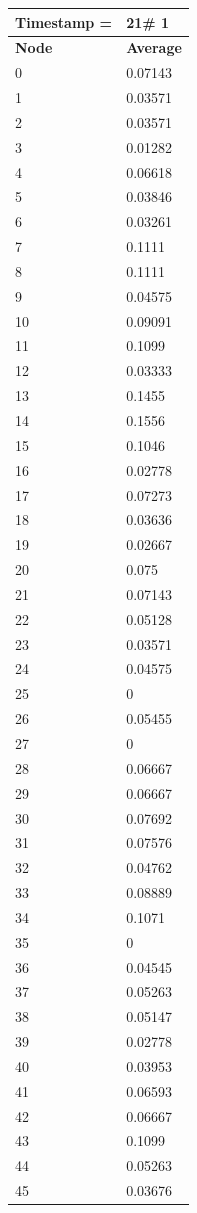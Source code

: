 \begin{tabular}{|l||l|}
\hline
\textbf{Timestamp =} & \textbf{21}\# 1\\\hline
	\textbf{Node} & \textbf{Average} \\ \hline
\hline
	0 & 0.07143 \\ \hline
	1 & 0.03571 \\ \hline
	2 & 0.03571 \\ \hline
	3 & 0.01282 \\ \hline
	4 & 0.06618 \\ \hline
	5 & 0.03846 \\ \hline
	6 & 0.03261 \\ \hline
	7 & 0.1111 \\ \hline
	8 & 0.1111 \\ \hline
	9 & 0.04575 \\ \hline
	10 & 0.09091 \\ \hline
	11 & 0.1099 \\ \hline
	12 & 0.03333 \\ \hline
	13 & 0.1455 \\ \hline
	14 & 0.1556 \\ \hline
	15 & 0.1046 \\ \hline
	16 & 0.02778 \\ \hline
	17 & 0.07273 \\ \hline
	18 & 0.03636 \\ \hline
	19 & 0.02667 \\ \hline
	20 & 0.075 \\ \hline
	21 & 0.07143 \\ \hline
	22 & 0.05128 \\ \hline
	23 & 0.03571 \\ \hline
	24 & 0.04575 \\ \hline
	25 & 0 \\ \hline
	26 & 0.05455 \\ \hline
	27 & 0 \\ \hline
	28 & 0.06667 \\ \hline
	29 & 0.06667 \\ \hline
	30 & 0.07692 \\ \hline
	31 & 0.07576 \\ \hline
	32 & 0.04762 \\ \hline
	33 & 0.08889 \\ \hline
	34 & 0.1071 \\ \hline
	35 & 0 \\ \hline
	36 & 0.04545 \\ \hline
	37 & 0.05263 \\ \hline
	38 & 0.05147 \\ \hline
	39 & 0.02778 \\ \hline
	40 & 0.03953 \\ \hline
	41 & 0.06593 \\ \hline
	42 & 0.06667 \\ \hline
	43 & 0.1099 \\ \hline
	44 & 0.05263 \\ \hline
	45 & 0.03676 \\ \hline
\end{tabular}
